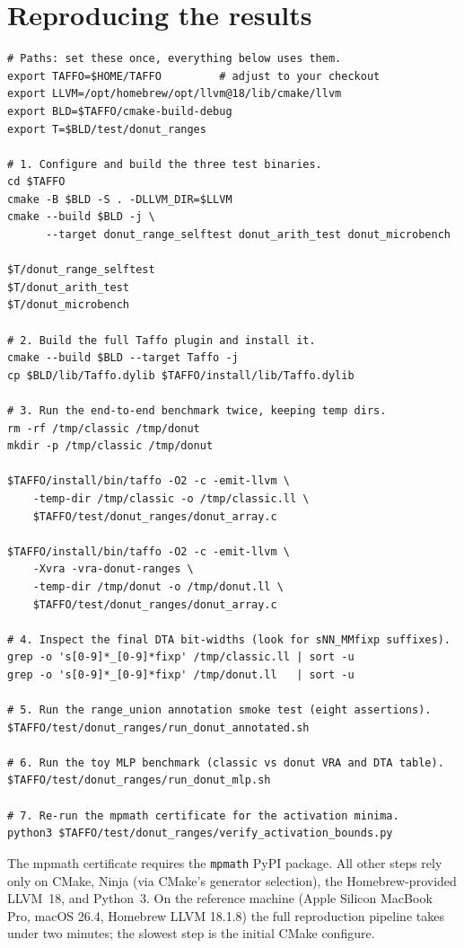 \documentclass[11pt,a4paper]{article}
\theoremstyle{plain}
\begin{document}
\appendix
\section{Reproducing the results}
\label{app:reproduce}

\begin{lstlisting}[style=shell,caption={Build and run the tests, micro-benchmark, and end-to-end benchmark.}]
# Paths: set these once, everything below uses them.
export TAFFO=$HOME/TAFFO         # adjust to your checkout
export LLVM=/opt/homebrew/opt/llvm@18/lib/cmake/llvm
export BLD=$TAFFO/cmake-build-debug
export T=$BLD/test/donut_ranges

# 1. Configure and build the three test binaries.
cd $TAFFO
cmake -B $BLD -S . -DLLVM_DIR=$LLVM
cmake --build $BLD -j \
      --target donut_range_selftest donut_arith_test donut_microbench

$T/donut_range_selftest
$T/donut_arith_test
$T/donut_microbench

# 2. Build the full Taffo plugin and install it.
cmake --build $BLD --target Taffo -j
cp $BLD/lib/Taffo.dylib $TAFFO/install/lib/Taffo.dylib

# 3. Run the end-to-end benchmark twice, keeping temp dirs.
rm -rf /tmp/classic /tmp/donut
mkdir -p /tmp/classic /tmp/donut

$TAFFO/install/bin/taffo -O2 -c -emit-llvm \
    -temp-dir /tmp/classic -o /tmp/classic.ll \
    $TAFFO/test/donut_ranges/donut_array.c

$TAFFO/install/bin/taffo -O2 -c -emit-llvm \
    -Xvra -vra-donut-ranges \
    -temp-dir /tmp/donut -o /tmp/donut.ll \
    $TAFFO/test/donut_ranges/donut_array.c

# 4. Inspect the final DTA bit-widths (look for sNN_MMfixp suffixes).
grep -o 's[0-9]*_[0-9]*fixp' /tmp/classic.ll | sort -u
grep -o 's[0-9]*_[0-9]*fixp' /tmp/donut.ll   | sort -u

# 5. Run the range_union annotation smoke test (eight assertions).
$TAFFO/test/donut_ranges/run_donut_annotated.sh

# 6. Run the toy MLP benchmark (classic vs donut VRA and DTA table).
$TAFFO/test/donut_ranges/run_donut_mlp.sh

# 7. Re-run the mpmath certificate for the activation minima.
python3 $TAFFO/test/donut_ranges/verify_activation_bounds.py
\end{lstlisting}

The mpmath certificate requires the \texttt{mpmath} PyPI package.
All other steps rely only on CMake, Ninja (via CMake's generator
selection), the Homebrew-provided LLVM~18, and Python~3. On the
reference machine (Apple Silicon MacBook Pro, macOS 26.4, Homebrew
LLVM 18.1.8) the full reproduction pipeline takes under two
minutes; the slowest step is the initial CMake configure.
\end{document}
